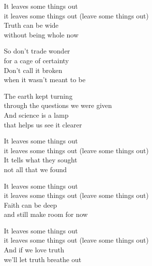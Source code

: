\begin{lyrics}
It leaves some things out\\
it leaves some things out
(leave some things out)\\
Truth can be wide\\
without being whole now

So don’t trade wonder\\
for a cage of certainty\\
Don’t call it broken\\
when it wasn’t meant to be

The earth kept turning\\
through the questions we were given\\
And science is a lamp\\
that helps us see it clearer

It leaves some things out\\
it leaves some things out
(leave some things out)\\
It tells what they sought\\
not all that we found

It leaves some things out\\
it leaves some things out
(leave some things out)\\
Faith can be deep\\
and still make room for now

It leaves some things out\\
it leaves some things out
(leave some things out)\\
And if we love truth\\
we’ll let truth breathe out
\end{lyrics}

